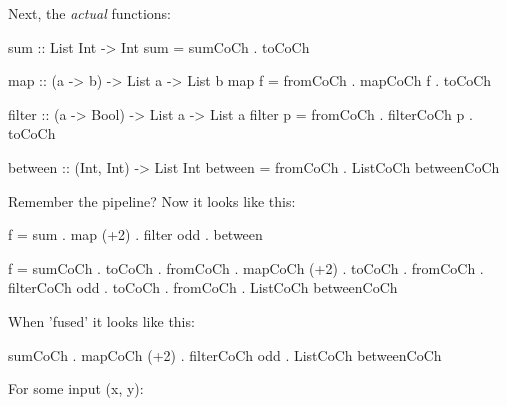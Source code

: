 Next, the \textit{actual} functions:
\begin{spec}
sum :: List Int -> Int
sum = sumCoCh . toCoCh

map :: (a -> b) -> List a -> List b
map f = fromCoCh . mapCoCh f . toCoCh

filter :: (a -> Bool) -> List a -> List a
filter p = fromCoCh . filterCoCh p . toCoCh

between :: (Int, Int) -> List Int
between = fromCoCh . ListCoCh betweenCoCh
\end{spec}
Remember the pipeline? Now it looks like this:
\begin{spec}
f = sum . map (+2) . filter odd . between

f =	     sumCoCh          . toCoCh .
fromCoCh . mapCoCh (+2)   . toCoCh .
fromCoCh . filterCoCh odd . toCoCh .
fromCoCh . ListCoCh betweenCoCh
\end{spec}
When 'fused' it looks like this:
\begin{spec}
sumCoCh . mapCoCh (+2) . filterCoCh odd . ListCoCh betweenCoCh
\end{spec}
For some input (x, y):
